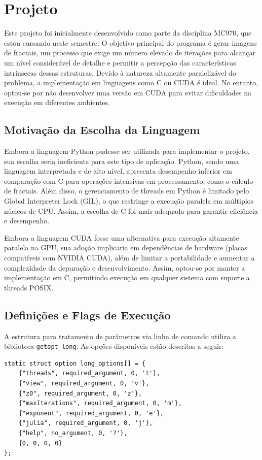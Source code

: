 \section{Projeto}

Este projeto foi inicialmente desenvolvido como parte da disciplina MC970, que estou cursando neste semestre. O objetivo principal do programa é gerar imagens de fractais, um processo que exige um número elevado de iterações para alcançar um nível considerável de detalhe e permitir a percepção das características intrínsecas dessas estruturas. Devido à natureza altamente paralelizável do problema, a implementação em linguagens como C ou CUDA é ideal. No entanto, optou-se por não desenvolver uma versão em CUDA para evitar dificuldades na execução em diferentes ambientes.

\subsection{Motivação da Escolha da Linguagem}

Embora a linguagem Python pudesse ser utilizada para implementar o projeto, sua escolha seria ineficiente para este tipo de aplicação. Python, sendo uma linguagem interpretada e de alto nível, apresenta desempenho inferior em comparação com C para operações intensivas em processamento, como o cálculo de fractais. Além disso, o gerenciamento de threads em Python é limitado pelo Global Interpreter Lock (GIL), o que restringe a execução paralela em múltiplos núcleos de CPU. Assim, a escolha de C foi mais adequada para garantir eficiência e desempenho.

Embora a linguagem CUDA fosse uma alternativa para execução altamente paralela na GPU, sua adoção implicaria em dependências de hardware (placas compatíveis com NVIDIA CUDA), além de limitar a portabilidade e aumentar a complexidade da depuração e desenvolvimento. Assim, optou-se por manter a implementação em C, permitindo execução em qualquer sistema com suporte a threads POSIX.

\subsection{Definições e Flags de Execução}

A estrutura para tratamento de parâmetros via linha de comando utiliza a biblioteca \texttt{getopt\_long}. As opções disponíveis estão descritas a seguir:


\begin{lstlisting}[caption=Flags de linha de comando]
static struct option long_options[] = {
    {"threads", required_argument, 0, 't'},
    {"view", required_argument, 0, 'v'},
    {"z0", required_argument, 0, 'z'},
    {"maxIterations", required_argument, 0, 'm'},
    {"exponent", required_argument, 0, 'e'},
    {"julia", required_argument, 0, 'j'},
    {"help", no_argument, 0, '?'},
    {0, 0, 0, 0}
};
\end{lstlisting}


